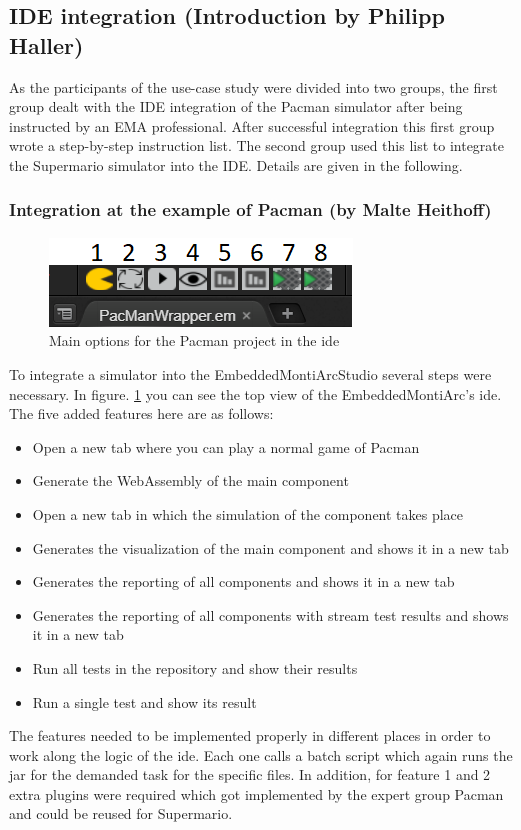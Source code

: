 \subsection{IDE integration (Introduction by Philipp Haller)}

As the participants of the use-case study were divided into two groups, the first group dealt with the IDE integration of the Pacman simulator after being instructed by an EMA professional.
After successful integration this first group wrote a step-by-step instruction list. The second group used this list to integrate the Supermario simulator into the IDE. Details are given in the following.

\subsubsection{Integration at the example of Pacman (by Malte Heithoff)}
\begin{figure}
	\label{fig:idePacmanTop}
	\centering
	\includegraphics[scale=0.55]{pictures/IDE/IDETop.png}
	\caption{Main options for the Pacman project in the ide}
\end{figure}
To integrate a simulator into the EmbeddedMontiArcStudio several steps were necessary. In figure. \ref{fig:idePacmanTop} you can see the top view of the EmbeddedMontiArc's ide. The five added features here are as follows:
\begin{itemize}
	\item[1.] Open a new tab where you can play a normal game of Pacman
	\item[2.] Generate the WebAssembly of the main component
	\item[3.] Open a new tab in which the simulation of the component takes place
	\item[4.] Generates the visualization of the main component and shows it in a new tab
	\item[5.] Generates the reporting of all components and shows it in a new tab
	\item[6.] Generates the reporting of all components with stream test results and shows it in a new tab
	\item[7.] Run all tests in the repository and show their results
	\item[8.] Run a single test and show its result
\end{itemize}
The features needed to be implemented properly in different places in order to work along the logic of the ide. Each one calls a batch script which again runs the jar for the demanded task for the specific files. In addition, for feature 1 and 2 extra plugins were required which got implemented by the expert group Pacman and could be reused for Supermario.